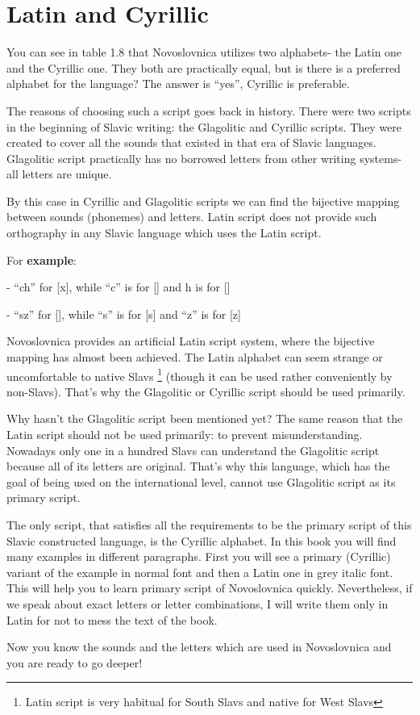 \section{Latin and Cyrillic}

You can see in table 1.8 that Novoslovnica utilizes two alphabets- the Latin one and the Cyrillic one. They both are practically equal, but is there is a preferred alphabet for the language? The answer is “yes”, Cyrillic is preferable.

The reasons of choosing such a script goes back in history. There were two scripts in the beginning of Slavic writing: the Glagolitic and Cyrillic scripts. They were created to cover all the sounds that existed in that era of Slavic languages. Glagolitic script practically has no borrowed letters from other writing systems- all letters are unique.

By this case in Cyrillic and Glagolitic scripts we can find the bijective mapping between sounds (phonemes) and letters. Latin script does not provide such orthography in any Slavic language which uses the Latin script. 

For \textbf{example}:

- “ch” for [x], while “c” is for [] and h is for []

- “sz” for [], while “s” is for [s] and “z” is for [z]

Novoslovnica provides an artificial Latin script system, where the bijective mapping has almost been achieved. The Latin alphabet can seem strange or uncomfortable to native Slavs \footnote{Latin script is very habitual for South Slavs and native for West Slavs} (though it can be used rather conveniently by non-Slavs). That’s why the Glagolitic or Cyrillic script should be used primarily.

Why hasn’t the Glagolitic script been mentioned yet? The same reason that the Latin script should not be used primarily: to prevent misunderstanding. Nowadays only one in a hundred Slavs can understand the Glagolitic script because all of its letters are original. That’s why this language, which has the goal of being used on the international level, cannot use Glagolitic script as its primary script.

The only script, that satisfies all the requirements to be the primary script of this Slavic constructed language, is the Cyrillic alphabet. In this book you will find many examples in different paragraphs. First you will see a primary (Cyrillic) variant of the example in normal font and then a Latin one in grey italic font. This will help you to learn primary script of Novoslovnica quickly. Nevertheless, if we speak about exact letters or letter combinations, I will write them only in Latin for not to mess the text of the book.

Now you know the sounds and the letters which are used in Novoslovnica and you are ready to go deeper!
